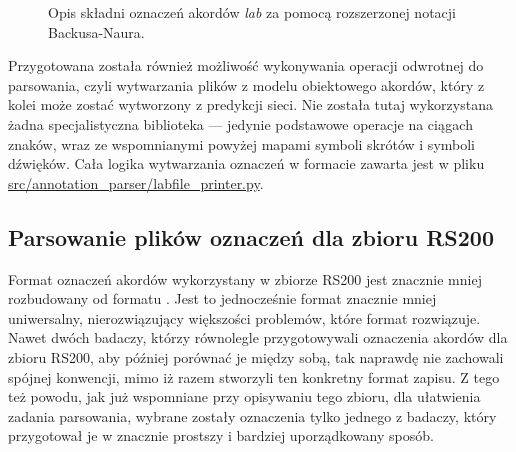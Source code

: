 \begin{figure}[tb]
    \centering
    {\scriptsize }
    \caption{Opis składni oznaczeń akordów \emph{lab} za pomocą rozszerzonej notacji Backusa-Naura.}
    \label{fig:lab_syntax}
\end{figure}

Przygotowana została również możliwość wykonywania operacji odwrotnej do parsowania, czyli wytwarzania plików  z modelu obiektowego akordów, który z kolei może zostać wytworzony z predykcji sieci. Nie została tutaj wykorzystana żadna specjalistyczna biblioteka --- jedynie podstawowe operacje na ciągach znaków, wraz ze wspomnianymi powyżej mapami symboli skrótów i symboli dźwięków. Cała logika wytwarzania oznaczeń w formacie  zawarta jest w pliku \url{src/annotation_parser/labfile_printer.py}.

\subsection{Parsowanie plików oznaczeń dla zbioru RS200}

Format oznaczeń akordów wykorzystany w zbiorze RS200 jest znacznie mniej rozbudowany od formatu . Jest to jednocześnie format znacznie mniej uniwersalny, nierozwiązujący większości problemów, które format  rozwiązuje. Nawet dwóch badaczy, którzy równolegle przygotowywali oznaczenia akordów dla zbioru RS200, aby później porównać je między sobą, tak naprawdę nie zachowali spójnej konwencji, mimo iż razem stworzyli ten konkretny format zapisu. Z tego też powodu, jak już wspomniane przy opisywaniu tego zbioru, dla ułatwienia zadania parsowania, wybrane zostały oznaczenia tylko jednego z badaczy, który przygotował je w znacznie prostszy i bardziej uporządkowany sposób.

